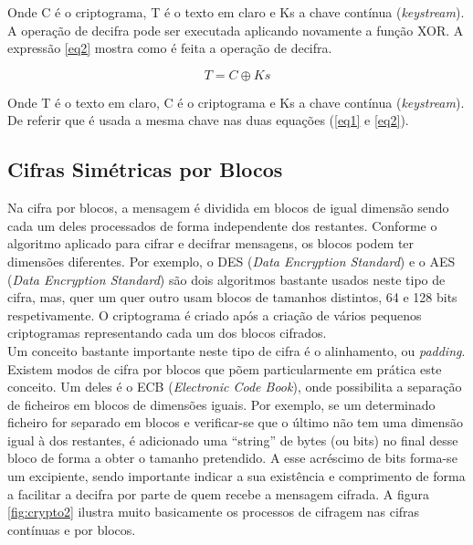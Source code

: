 \documentclass[a4paper,11pt,openright,oneside]{report}
\begin{document}
Onde C é o criptograma, T é o texto em claro e Ks a chave contínua (\textit{keystream}).\\

A operação de decifra pode ser executada aplicando novamente a função XOR. A expressão \ref{eq2} mostra como é feita a operação de decifra.

\begin{equation}
\label{eq2}
T = C \oplus Ks
\end{equation}

Onde T é o texto em claro, C é o criptograma e Ks a chave contínua (\textit{keystream}).\\

De referir que é usada a mesma chave nas duas equações (\ref{eq1} e \ref{eq2}).

\subsection{Cifras Simétricas por Blocos}

Na cifra por blocos, a mensagem é dividida em blocos de igual dimensão sendo cada um deles processados de forma independente dos restantes. Conforme o algoritmo aplicado para cifrar e decifrar mensagens, os blocos podem ter dimensões diferentes. Por exemplo, o DES (\textit{Data Encryption Standard}) e o AES (\textit{Data Encryption Standard}) são dois algoritmos bastante usados neste tipo de cifra, mas, quer um quer outro usam blocos de tamanhos distintos, 64 e 128 bits respetivamente. O criptograma é criado após a criação de vários pequenos criptogramas representando cada um dos blocos cifrados.\\

Um conceito bastante importante neste tipo de cifra é o alinhamento, ou \textit{padding}. Existem modos de cifra por blocos que põem particularmente em prática este conceito. Um deles é o ECB (\textit{Electronic Code Book}), onde possibilita a separação de ficheiros em blocos de dimensões iguais. Por exemplo, se um determinado ficheiro for separado em blocos e verificar-se que o último não tem uma dimensão igual à dos restantes, é adicionado uma “string” de bytes (ou bits) no final desse bloco de forma a obter o tamanho pretendido. A esse acréscimo de bits forma-se um excipiente, sendo importante indicar a sua existência e comprimento de forma a facilitar a decifra por parte de quem recebe a mensagem cifrada. A figura \ref{fig:crypto2} ilustra muito basicamente os processos de cifragem nas cifras contínuas e por blocos.
\end{document}
